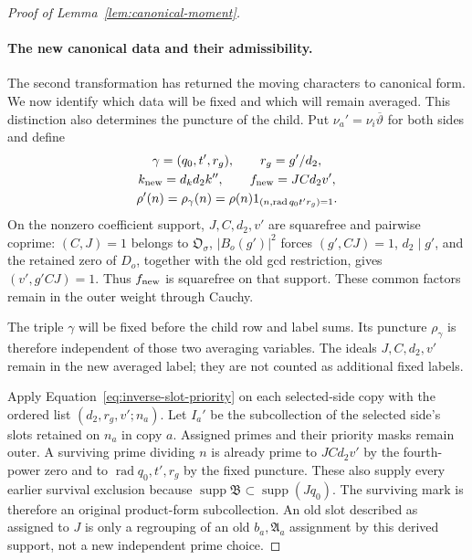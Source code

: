 \documentclass[12pt]{article}
\begin{document}
\begin{proof}[Proof of Lemma~\ref{lem:canonical-moment}]
\paragraph{The new canonical data and their admissibility.}
The second transformation has returned the moving characters to canonical
form. We now identify which data will be fixed and which will remain
averaged. This distinction also determines the puncture of the child.
Put \(\nu_a'=\nu_i\overline\vartheta\) for both sides and define
\begin{equation}\label{eq:canonical-child-data}
 \begin{gathered}
 \gamma=(q_0,t',r_g),\qquad r_g=g'/d_2,\\
 k_{\rm new}=d_kd_2k'',\qquad f_{\rm new}=JCd_2v',\\
 \rho'(n)=\rho_\gamma(n)=\rho(n)1_{(n,\operatorname{rad}q_0t'r_g)=1}.
 \end{gathered}
\end{equation}
On the nonzero coefficient support, \(J,C,d_2,v'\) are squarefree
and pairwise coprime: \((C,J)=1\) belongs to \(\mathfrak O_\sigma\),
\(|B_o(g')|^2\) forces \((g',CJ)=1\), \(d_2\mid g'\), and the
retained zero of \(D_o\), together with the old gcd restriction, gives
\((v',g'CJ)=1\). Thus \(f_{\rm new}\) is squarefree on that support.
These common factors remain in the outer weight through Cauchy.

The triple \(\gamma\) will be fixed before the child row and label sums.
Its puncture \(\rho_\gamma\) is therefore independent of those two
averaging variables. The ideals \(J,C,d_2,v'\) remain in the new
averaged label; they are not counted as additional fixed labels.

Apply Equation~\eqref{eq:inverse-slot-priority} on each selected-side
copy with the ordered list \((d_2,r_g,v';n_a)\).  Let \(I_a'\) be the
subcollection of the selected side's slots retained on \(n_a\) in copy
\(a\).  Assigned primes and their priority masks remain outer.
A surviving prime dividing \(n\)
is already prime to \(JCd_2v'\) by the fourth-power zero and to
\(\operatorname{rad}q_0,t',r_g\) by the fixed puncture.  These also
supply every earlier survival exclusion because
\(\operatorname{supp}\mathfrak B\subset\operatorname{supp}(Jq_0)\).
The surviving mark is therefore an original product-form subcollection.
An old slot described as assigned to \(J\) is only a regrouping of an
old \(b_a,\mathfrak A_a\) assignment by this derived support, not a
new independent prime choice.


\end{proof}
\end{document}

